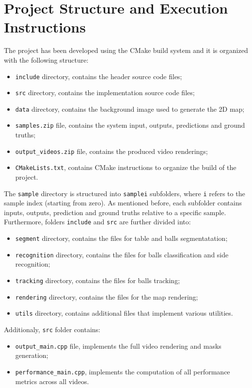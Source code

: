 \section{Project Structure and Execution Instructions}


The project has been developed using the CMake build system and it is organized with the
following structure:
\begin{itemize}
    \item \verb|include| directory, contains the header source code files;
    \item \verb|src| directory, contains the implementation source code files;
    \item \verb|data| directory, contains the background image used to generate the 2D map;
    \item \verb|samples.zip| file, contains the system input, outputs, predictions and ground truths;
    \item \verb|output_videos.zip| file, contains the produced video renderings;
    \item \verb|CMakeLists.txt|, contains CMake instructions to organize the build of the project. 
\end{itemize}

\noindent
The \verb|sample| directory is structured into \verb|samplei| subfolders, where \verb|i| refers to the sample index (starting from zero).
As mentioned before, each subfolder contains inputs, outputs, prediction and ground truths relative to a specific sample.
\\
\noindent
Furthermore, folders \verb|include| and \verb|src| are further divided into:
\begin{itemize}
    \item \verb|segment| directory, contains the files for table and balls segmentatation;
    \item \verb|recognition| directory, contains the files for balls classification and side recognition;
    \item \verb|tracking| directory, contains the files for balls tracking;
    \item \verb|rendering| directory, contains the files for the map rendering;
    \item \verb|utils| directory, contains additional files that implement various utilities.
\end{itemize}

\noindent
Additionaly, \verb|src| folder contains:
\begin{itemize}
    \item \verb|output_main.cpp| file, implements the full video rendering and masks generation;
    \item \verb|performance_main.cpp|, implements the computation of all performance metrics across all videos.
\end{itemize}


